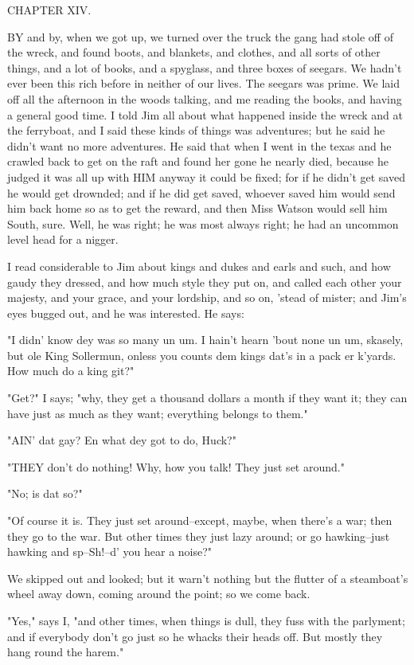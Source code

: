 CHAPTER XIV.

BY and by, when we got up, we turned over the truck the gang had stole
off of the wreck, and found boots, and blankets, and clothes, and all
sorts of other things, and a lot of books, and a spyglass, and three
boxes of seegars.  We hadn't ever been this rich before in neither of our
lives.  The seegars was prime.  We laid off all the afternoon in the
woods talking, and me reading the books, and having a general good time.
I told Jim all about what happened inside the wreck and at the ferryboat,
and I said these kinds of things was adventures; but he said he didn't
want no more adventures.  He said that when I went in the texas and he
crawled back to get on the raft and found her gone he nearly died,
because he judged it was all up with HIM anyway it could be fixed; for if
he didn't get saved he would get drownded; and if he did get saved,
whoever saved him would send him back home so as to get the reward, and
then Miss Watson would sell him South, sure.  Well, he was right; he was
most always right; he had an uncommon level head for a nigger.

I read considerable to Jim about kings and dukes and earls and such, and
how gaudy they dressed, and how much style they put on, and called each
other your majesty, and your grace, and your lordship, and so on, 'stead
of mister; and Jim's eyes bugged out, and he was interested.  He says:

"I didn' know dey was so many un um.  I hain't hearn 'bout none un um,
skasely, but ole King Sollermun, onless you counts dem kings dat's in a
pack er k'yards.  How much do a king git?"

"Get?"  I says; "why, they get a thousand dollars a month if they want
it; they can have just as much as they want; everything belongs to them."

"AIN' dat gay?  En what dey got to do, Huck?"

"THEY don't do nothing!  Why, how you talk! They just set around."

"No; is dat so?"

"Of course it is.  They just set around--except, maybe, when there's a
war; then they go to the war.  But other times they just lazy around; or
go hawking--just hawking and sp--Sh!--d' you hear a noise?"

We skipped out and looked; but it warn't nothing but the flutter of a
steamboat's wheel away down, coming around the point; so we come back.

"Yes," says I, "and other times, when things is dull, they fuss with the
parlyment; and if everybody don't go just so he whacks their heads off.
But mostly they hang round the harem."

